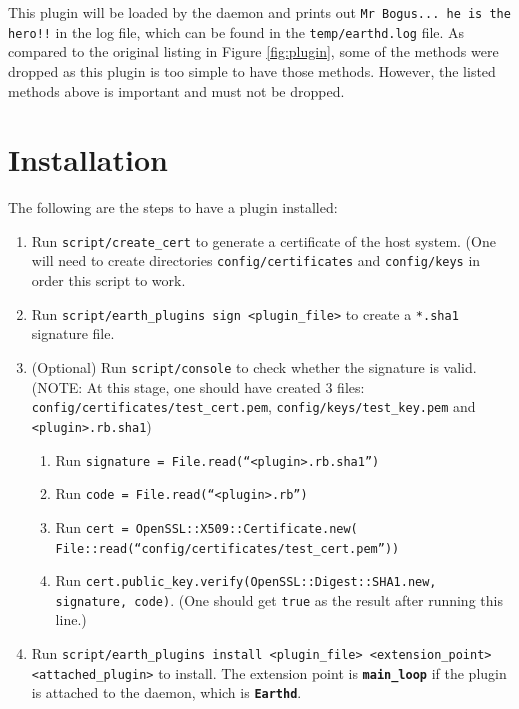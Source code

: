 \documentclass{article}
\begin{document}
This plugin will be loaded by the daemon and prints out \texttt{Mr Bogus... he is the hero!!} in the log file, which can be found in the \texttt{temp/earthd.log} file. As compared to the original listing in Figure \ref{fig:plugin}, some of the methods were dropped as this plugin is too simple to have those methods. However, the listed methods above is important and must not be dropped. 


\section{Installation} %
\label{sec:installation}

The following are the steps to have a plugin installed:

\begin{enumerate}
    \item Run \texttt{script/create\_cert} to generate a certificate of the host system. (One will need to create directories \texttt{config/certificates} and \texttt{config/keys} in order this script to work. 
    \item Run \texttt{script/earth\_plugins sign <plugin\_file>} to create a \texttt{*.sha1} signature file. 
    \item (Optional) Run \texttt{script/console} to check whether the signature is valid. (NOTE: At this stage, one should have created 3 files: \texttt{config/certificates/test\_cert.pem}, \texttt{config/keys/test\_key.pem} and \texttt{<plugin>.rb.sha1})
        \begin{enumerate}
            \item Run \texttt{signature = File.read(``<plugin>.rb.sha1'')}
            \item Run \texttt{code = File.read(``<plugin>.rb'')}
            \item Run \texttt{cert = OpenSSL::X509::Certificate.new( \\ File::read(``config/certificates/test\_cert.pem''))}
            \item Run \texttt{cert.public\_key.verify(OpenSSL::Digest::SHA1.new, signature, code)}. (One should get \texttt{true} as the result after running this line.)
        \end{enumerate}
    \item Run \texttt{script/earth\_plugins install <plugin\_file> <extension\_point> <attached\_plugin>} to install. The extension point is \textbf{\texttt{main\_loop}} if the plugin is attached to the daemon, which is \textbf{\texttt{Earthd}}. 
\end{enumerate}
\end{document}
